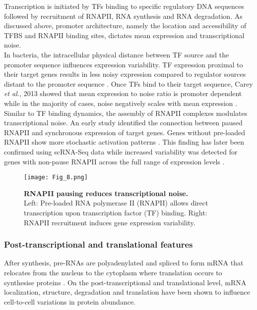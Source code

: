 Transcription is initiated by TFs binding to specific regulatory DNA sequences followed by recruitment of RNAPII, RNA synthesis and RNA degradation. As discussed above, promoter architecture, namely the location and accessibility of TFBS and RNAPII binding sites, dictates mean expression and transcriptional noise. \\

In bacteria, the intracellular physical distance between TF source and the promoter sequence influences expression variability. TF expression proximal to their target genes results in less noisy expression compared to regulator sources distant to the promoter sequence \citep{Goni-Moreno2017}. Once TFs bind to their target sequence, Carey \emph{et al.}, 2013 showed that mean expression to noise ratio is promoter dependent while in the majority of cases, noise negatively scales with mean expression \citep{Carey2013}. \\

Similar to TF binding dynamics, the assembly of RNAPII complexes modulates transcriptional noise. An early study identified the connection between paused RNAPII and synchronous expression of target genes. Genes without pre-loaded RNAPII show more stochastic activation patterns \citep{Boettiger2009}. This finding has later been confirmed using scRNA-Seq data while increased variability was detected for genes with non-pause RNAPII across the full range of expression levels \citep{Day2016}.

\begin{figure}[!h]
\centering
\texttt{[image: Fig\_8.png]}
\caption[RNAPII pausing reduces transcriptional noise]{\textbf{RNAPII pausing reduces transcriptional noise.}\\
Left: Pre-loaded RNA polymerase II (RNAPII) allows direct transcription upon transcription factor (TF) binding. Right: RNAPII recruitment induces gene expression variability.}
\label{fig0:DNA_features}
\end{figure} 

\newpage

\subsubsection{Post-transcriptional and translational features}

After synthesis, pre-RNAs are polyadenylated and spliced to form mRNA that relocates from the nucleus to the cytoplasm where translation occurs to synthesise proteins \cite{Glisovic2008}. On the post-transcriptional and translational level, mRNA localization, structure, degradation and translation have been shown to influence cell-to-cell variations in protein abundance.

